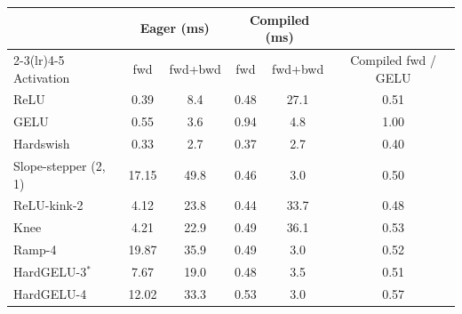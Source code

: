 \begin{tabular}{lccccc}
\toprule
 & \multicolumn{2}{c}{Eager (ms)} & \multicolumn{2}{c}{Compiled (ms)} & \\
\cmidrule(lr){2-3}\cmidrule(lr){4-5}
Activation & fwd & fwd+bwd & fwd & fwd+bwd & Compiled fwd / GELU \\
\midrule
ReLU & 0.39 & 8.4 & 0.48 & 27.1 & 0.51 \\
GELU & 0.55 & 3.6 & 0.94 & 4.8 & 1.00 \\
Hardswish & 0.33 & 2.7 & 0.37 & 2.7 & 0.40 \\
Slope-stepper (2, 1) & 17.15 & 49.8 & 0.46 & 3.0 & 0.50 \\
ReLU-kink-2 & 4.12 & 23.8 & 0.44 & 33.7 & 0.48 \\
Knee & 4.21 & 22.9 & 0.49 & 36.1 & 0.53 \\
Ramp-4 & 19.87 & 35.9 & 0.49 & 3.0 & 0.52 \\
HardGELU-3$^\ast$ & 7.67 & 19.0 & 0.48 & 3.5 & 0.51 \\
HardGELU-4 & 12.02 & 33.3 & 0.53 & 3.0 & 0.57 \\
\bottomrule
\end{tabular}
